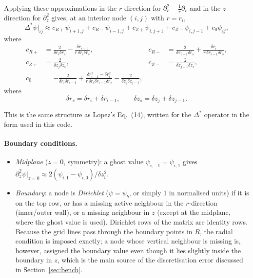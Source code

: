\documentclass[11pt,a4paper]{article}
\newcommand{\Dstar}{\Delta^{\!*}}
\begin{document}
Applying these approximations in the $r$-direction for
$\partial_r^2-\tfrac{1}{r}\partial_r$ and in the $z$-direction for
$\partial_z^2$ gives, at an interior node $(i,j)$ with $r=r_i$,
\begin{equation}
    \Dstar\psi\big|_{ij}
    \approx
    c_{R+}\psi_{i+1,j}
    +c_{R-}\psi_{i-1,j}
    +c_{Z+}\psi_{i,j+1}
    +c_{Z-}\psi_{i,j-1}
    +c_0\psi_{ij},
\end{equation}
where
\begin{align*}
    c_{R+}
    &=
    \frac{2}{\delta r_i\delta r_s}
    -
    \frac{\delta r_{i-1}}
    {r\,\delta r_i\delta r_s},
    &
    c_{R-}
    &=
    \frac{2}{\delta r_{i-1}\delta r_s}
    +
    \frac{\delta r_i}
    {r\,\delta r_{i-1}\delta r_s},
    \\[6pt]
    c_{Z+}
    &=
    \frac{2}{\delta z_j\delta z_s},
    &
    c_{Z-}
    &=
    \frac{2}{\delta z_{j-1}\delta z_s},
    \\[6pt]
    c_0
    &=
    -\frac{2}{\delta r_i\delta r_{i-1}}
    +
    \frac{
        \delta r_{i-1}^2-\delta r_i^2
    }{
        r\,\delta r_i\delta r_{i-1}\delta r_s
    }
    -
    \frac{2}{\delta z_j\delta z_{j-1}},
\end{align*}
where
\[
\delta r_s=\delta r_i+\delta r_{i-1},
\qquad
\delta z_s=\delta z_j+\delta z_{j-1}.
\]

This is the same structure as Lopez's Eq.~(14), written for the $\Delta^*$ operator
in the form used in this code.



\paragraph{Boundary conditions.}
\begin{itemize}[nosep]
\item \emph{Midplane} ($z=0$, symmetry): a ghost value $\psi_{i,-1}=\psi_{i,1}$ gives $\partial_z^2\psi|_{z=0}\approx 2(\psi_{i,1}-\psi_{i,0})/\delta z_i^2$.
\item \emph{Boundary}: a node is \emph{Dirichlet} ($\psi=\psi_b$, or simply $1$ in normalised units) if it is on the top row, or has a missing active neighbour in the $r$-direction (inner/outer wall), or a missing neighbour in $z$ (except at the midplane, where the ghost value is used). Dirichlet rows of the matrix are identity rows. Because the grid lines pass through the boundary points in $R$, the radial condition is imposed exactly; a node whose vertical neighbour is missing is, however, assigned the boundary value even though it lies slightly inside the boundary in $z$, which is the main source of the discretisation error discussed in Section~\ref{sec:bench}.
\end{itemize}
\end{document}
